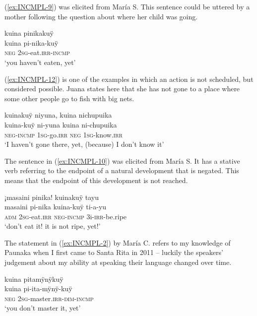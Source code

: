 (\ref{ex:INCMPL-9}) was elicited from María S. This sentence could be uttered by a mother following the question about where her child was going.

\ea\label{ex:INCMPL-9}
\begingl
\glpreamble kuina pinikakuÿ\\
\gla kuina pi-nika-kuÿ\\
\glb \textsc{neg} 2\textsc{sg}-eat.\textsc{irr}-\textsc{incmp}\\
\glft ‘you haven’t eaten, yet’
\endgl
{}
\xe

(\ref{ex:INCMPL-12}) is one of the examples in which an action is not scheduled, but considered possible. Juana states here that she has not gone to a place where some other people go to fish with big nets. 

\ea\label{ex:INCMPL-12}
\begingl
\glpreamble kuinakuÿ niyuna, kuina nichupuika\\
\gla kuina-kuÿ ni-yuna kuina ni-chupuika\\
\glb \textsc{neg}-\textsc{incmp} 1\textsc{sg}-go.\textsc{irr} \textsc{neg} 1\textsc{sg}-know.\textsc{irr}\\
\glft ‘I haven’t gone there, yet, (because) I don’t know it’
\endgl
\trailingcitation{[jxx-e190210s-01]}
\xe

The sentence in (\ref{ex:INCMPL-10}) was elicited from María S. It has a stative verb referring to the endpoint of a natural development that is negated. This means that the endpoint of this development is not reached.

\ea\label{ex:INCMPL-10}
\begingl
\glpreamble ¡masaini pinika! kuinakuÿ tayu\\
\gla masaini pi-nika kuina-kuÿ ti-a-yu\\
\glb \textsc{adm} 2\textsc{sg}-eat.\textsc{irr} \textsc{neg}-\textsc{incmp} 3i-\textsc{irr}-be.ripe\\
\glft ‘don’t eat it! it is not ripe, yet!’
\endgl
\trailingcitation{[rxx-e181022le]}
\xe

The statement in (\ref{ex:INCMPL-2}) by María C. refers to my knowledge of Paunaka when I first came to Santa Rita in 2011 – luckily the speakers’ judgement about my ability at speaking their language changed over time.

\ea\label{ex:INCMPL-2}
\begingl 
\glpreamble kuina pitamÿnÿkuÿ\\
\gla kuina pi-ita-mÿnÿ-kuÿ\\ 
\glb \textsc{neg} 2\textsc{sg}-master.\textsc{irr}-\textsc{dim}-\textsc{incmp}\\ 
\glft ‘you don’t master it, yet’
\trailingcitation{[uxx-p110825l.092]}
\xe

